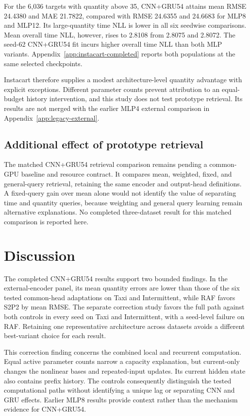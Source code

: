 \documentclass[runningheads]{llncs}
\begin{document}
For the 6,036 targets with quantity above 35, CNN+GRU54 attains mean RMSE 24.4380 and MAE 21.7822, compared with RMSE 24.6355 and 24.6683 for MLP8 and MLP12. Its large-quantity time NLL is lower in all six seedwise comparisons. Mean overall time NLL, however, rises to 2.8108 from 2.8075 and 2.8072. The seed-62 CNN+GRU54 fit incurs higher overall time NLL than both MLP variants. Appendix~\ref{app:instacart-completed} reports both populations at the same selected checkpoints.

Instacart therefore supplies a modest architecture-level quantity advantage with explicit exceptions. Different parameter counts prevent attribution to an equal-budget history intervention, and this study does not test prototype retrieval. Its results are not merged with the earlier MLP4 external comparison in Appendix~\ref{app:legacy-external}.

\subsection{Additional effect of prototype retrieval}
The matched CNN+GRU54 retrieval comparison remains pending a common-GPU baseline and resource contract. It compares mean, weighted, fixed, and general-query retrieval, retaining the same encoder and output-head definitions. A fixed-query gain over mean alone would not identify the value of separating time and quantity queries, because weighting and general query learning remain alternative explanations. No completed three-dataset result for this matched comparison is reported here.

\section{Discussion}
The completed CNN+GRU54 results support two bounded findings. In the external-encoder panel, its mean quantity errors are lower than those of the six tested common-head adaptations on Taxi and Intermittent, while RAF favors S2P2 by mean RMSE. The separate correction study favors the full path against both controls in every seed on Taxi and Intermittent, with a seed-level failure on RAF. Retaining one representative architecture across datasets avoids a different best-variant choice for each result.

This correction finding concerns the combined local and recurrent computation. Equal active parameter counts narrow a capacity explanation, but current-only changes the nonlinear bases and repeated-input updates. Its current hidden state also contains prefix history. The controls consequently distinguish the tested computational paths without identifying a unique lag or separating CNN and GRU effects. Earlier MLP8 results provide context rather than the mechanism evidence for CNN+GRU54.
\end{document}
